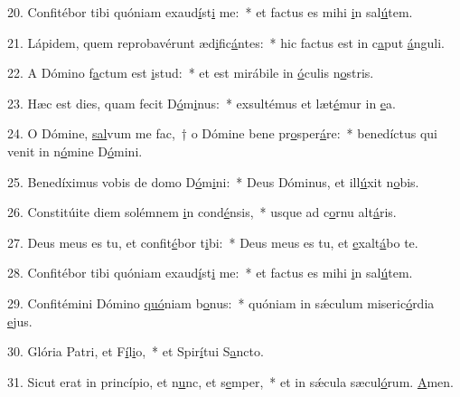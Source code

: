20. Confitébor tibi quóniam exaud\uline{í}st\uline{i} me:~* et factus es mihi \uline{i}n sal\uline{ú}tem.\par 
21. Lápidem, quem reprobavérunt æd\uline{i}fic\uline{á}ntes:~* hic factus est in c\uline{a}put \uline{á}nguli.\par 
22. A Dómino f\uline{a}ctum est \uline{i}stud:~* et est mirábile in \uline{ó}culis n\uline{o}stris.\par 
23. Hæc est dies, quam fecit D\uline{ó}m\uline{i}nus:~* exsultémus et læt\uline{é}mur in \uline{e}a.\par 
24. O Dómine, \uline{sal}vum me fac,~† o Dómine bene pr\uline{o}sper\uline{á}re:~* benedíctus qui venit in n\uline{ó}mine D\uline{ó}mini.\par 
25. Benedíximus vobis de domo D\uline{ó}m\uline{i}ni:~* Deus Dóminus, et ill\uline{ú}xit n\uline{o}bis.\par 
26. Constitúite diem solémnem \uline{i}n cond\uline{é}nsis,~* usque ad c\uline{o}rnu alt\uline{á}ris.\par 
27. Deus meus es tu, et confit\uline{é}bor t\uline{i}bi:~* Deus meus es tu, et \uline{e}xalt\uline{á}bo te.\par 
28. Confitébor tibi quóniam exaud\uline{í}st\uline{i} me:~* et factus es mihi \uline{i}n sal\uline{ú}tem.\par 
29. Confitémini Dómino \uline{quó}niam b\uline{o}nus:~* quóniam in sǽculum miseric\uline{ó}rdia \uline{e}jus.\par 
30. Glória Patri, et F\uline{í}l\uline{i}o,~* et Spir\uline{í}tui S\uline{a}ncto.\par 
31. Sicut erat in princípio, et n\uline{u}nc, et s\uline{e}mper,~* et in sǽcula sæcul\uline{ó}rum. \uline{A}men.\par 
